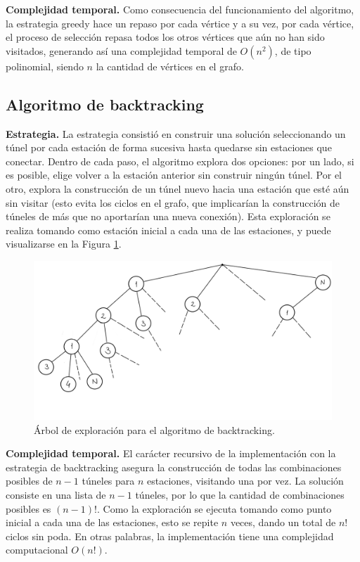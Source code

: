 \documentclass[10 pt, A4paper]{article}
\begin{document}
	\textbf{Complejidad temporal.} Como consecuencia del funcionamiento del algoritmo, la estrategia greedy hace un repaso por cada vértice y a su vez, por cada vértice, el proceso de selección repasa todos los otros vértices que aún no han sido visitados, generando así una complejidad temporal de $O(n^2)$, de tipo polinomial, siendo $n$ la cantidad de vértices en el grafo.
	
	\subsection*{Algoritmo de backtracking}

	\textbf{Estrategia.} La estrategia consistió en construir una solución seleccionando un túnel por cada estación de forma sucesiva hasta quedarse sin estaciones que conectar. Dentro de cada paso, el algoritmo explora dos opciones: por un lado, si es posible, elige volver a la estación anterior sin construir ningún túnel. Por el otro, explora la construcción de un túnel nuevo hacia una estación que esté aún sin visitar (esto evita los ciclos en el grafo, que implicarían la construcción de túneles de más que no aportarían una nueva conexión). Esta exploración se realiza tomando como estación inicial a cada una de las estaciones, y puede visualizarse en la Figura \ref{tree}.
	
	\begin{figure}[h]
		\centering
		\includegraphics[scale = 0.18]{Árbol de exploración.png}
		\caption{Árbol de exploración para el algoritmo de backtracking.}
		\label{tree}
	\end{figure}
	
	\textbf{Complejidad temporal.} El carácter recursivo de la implementación con la estrategia de backtracking asegura la construcción de todas las combinaciones posibles de $n-1$ túneles para $n$ estaciones, visitando una por vez. La solución consiste en una lista de $n-1$ túneles, por lo que la cantidad de combinaciones posibles es $(n-1)!$. Como la exploración se ejecuta tomando como punto inicial a cada una de las estaciones, esto se repite $n$ veces, dando un total de $n!$ ciclos sin poda. En otras palabras, la implementación tiene una complejidad computacional $O(n!)$.
	
\end{document}
